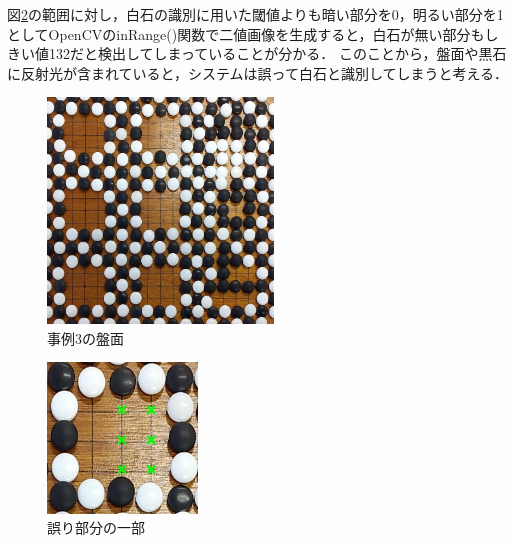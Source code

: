 \documentclass[openright]{nitocs}
\numberwithin{equation}{section}
\begin{document}
                図\ref{ex3_error}の範囲に対し，白石の識別に用いた閾値よりも暗い部分を0，明るい部分を1としてOpenCVのinRange()関数で二値画像を生成すると，白石が無い部分もしきい値132だと検出してしまっていることが分かる．
                このことから，盤面や黒石に反射光が含まれていると，システムは誤って白石と識別してしまうと考える．
                \begin{figure}[tb] %
                    \begin{center}
                    \includegraphics[clip,width=60mm]{DSC_0098/boardImg.jpg} 
                    \caption{事例3の盤面}
                    \label{ex3}
                    \end{center}
                \end{figure}

                \begin{figure}[tb] %
                    \begin{center}
                    \includegraphics[clip,width=40mm]{DSC_0098/TRIM_resultCompare.jpg} 
                    \caption{誤り部分の一部}
                    \label{ex3_error}
                    \end{center}
                \end{figure}
\end{document}
